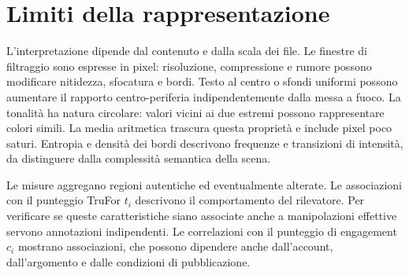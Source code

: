 \section{Limiti della rappresentazione}
\label{sec:metodi-feature-limiti}

L'interpretazione dipende dal contenuto e dalla scala dei file. Le finestre di filtraggio sono espresse in pixel: risoluzione, compressione e rumore possono modificare nitidezza, sfocatura e bordi. Testo al centro o sfondi uniformi possono aumentare il rapporto centro-periferia indipendentemente dalla messa a fuoco. La tonalità ha natura circolare: valori vicini ai due estremi possono rappresentare colori simili. La media aritmetica trascura questa proprietà e include pixel poco saturi. Entropia e densità dei bordi descrivono frequenze e transizioni di intensità, da distinguere dalla complessità semantica della scena.

Le misure aggregano regioni autentiche ed eventualmente alterate. Le associazioni con il punteggio TruFor $t_i$ descrivono il comportamento del rilevatore. Per verificare se queste caratteristiche siano associate anche a manipolazioni effettive servono annotazioni indipendenti. Le correlazioni con il punteggio di engagement $c_i$ mostrano associazioni, che possono dipendere anche dall'account, dall'argomento e dalle condizioni di pubblicazione.
